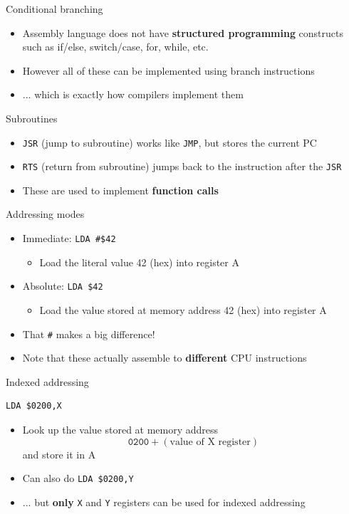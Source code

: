 \begin{frame}[fragile]{Conditional branching}
	\begin{itemize}
		\pause\item Assembly language does not have \textbf{structured programming} constructs
			such as if/else, switch/case, for, while, etc.
		\pause\item However all of these can be implemented using branch instructions
		\pause\item ... which is exactly how compilers implement them
	\end{itemize}
\end{frame}

\begin{frame}[fragile]{Subroutines}
	\begin{itemize}
		\pause\item \lstinline{JSR} (jump to subroutine) works like \lstinline{JMP}, but stores the current PC
		\pause\item \lstinline{RTS} (return from subroutine) jumps back to the instruction
			after the \lstinline{JSR}
		\pause\item These are used to implement \textbf{function calls}
	\end{itemize}
\end{frame}

\begin{frame}[fragile]{Addressing modes}
	\begin{itemize}
		\pause\item Immediate: \lstinline{LDA #$42}
			\begin{itemize}
				\pause\item Load the literal value 42 (hex) into register A
			\end{itemize}
		\pause\item Absolute: \lstinline{LDA $42}
			\begin{itemize}
				\pause\item Load the value stored at memory address 42 (hex) into register A
			\end{itemize}
		\pause\item That \lstinline{#} makes a big difference!
		\pause\item Note that these actually assemble to \textbf{different} CPU instructions
	\end{itemize}
\end{frame}

\begin{frame}[fragile]{Indexed addressing}
	\begin{lstlisting}
LDA $0200,X
	\end{lstlisting}
	\begin{itemize}
		\pause\item Look up the value stored at memory address
			$$ \texttt{0200} + (\text{value of X register}) $$
			and store it in A
		\pause\item Can also do \lstinline{LDA $0200,Y}
		\pause\item ... but \textbf{only} \lstinline{X} and \lstinline{Y} registers can be used for indexed addressing
	\end{itemize}
\end{frame}

